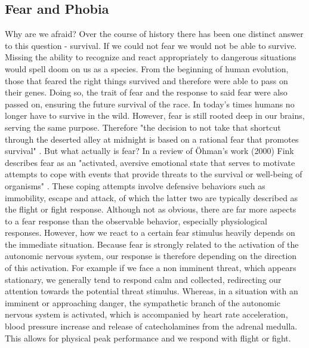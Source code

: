 \subsection{Fear and Phobia} 
Why are we afraid? Over the course of history there has been one distinct answer to this question - survival. If we could not fear we would not be able to survive. Missing the ability to recognize and react appropriately to dangerous situations would spell doom on us as a species. From the beginning of human evolution, those that feared the right things survived and therefore were able to pass on their genes. Doing so, the trait of fear and the response to said fear were also passed on, ensuring the future survival of the race. In today's times humans no longer have to survive in the wild. However, fear is still rooted deep in our brains, serving the same purpose. Therefore "the decision to not take that shortcut through the deserted alley at midnight is based on a rational fear that promotes survival" \cite{LAYTON2005}. But what actually is fear? In a review of Öhman's work (2000) Fink describes fear as an "activated, aversive emotional state that serves to motivate attempts to cope with events that provide threats to the survival or well-being of organisms" \cite{FINK2010}. These coping attempts involve defensive behaviors such as immobility, escape and attack, of which the latter two are typically described as the flight or fight response. Although not as obvious, there are far more aspects to a fear response than the observable behavior, especially physiological responses. However, how we react to a certain fear stimulus heavily depends on the immediate situation. Because fear is strongly related to the activation of the autonomic nervous system, our response is therefore depending on the direction of this activation. For example if we face a non imminent threat, which appears stationary, we generally tend to respond calm and collected, redirecting our attention towards the potential threat stimulus. Whereas, in a situation with an imminent or approaching danger, the sympathetic branch of the autonomic nervous system is activated, which is accompanied by heart rate acceleration, blood pressure increase and release of catecholamines from the adrenal medulla. This allows for physical peak performance and we respond with flight or fight. \\ 

